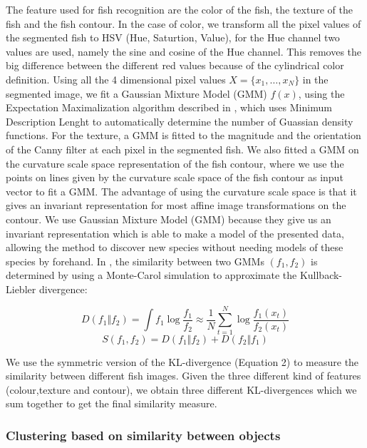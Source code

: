 The feature used for fish recognition are the color of the fish, the texture of the fish and the fish contour.
In the case of color, we transform all the pixel values of the segmented fish to HSV (Hue, Saturtion, 
Value), for the Hue channel two values are used, namely the sine and cosine of the Hue channel. This removes the big 
difference between the different red values because of the cylindrical color definition. Using all the 4 dimensional
pixel values $X = \{x_{1},\dots,x_{N}\}$ in the segmented image, we fit a Gaussian Mixture Model (GMM) $f(x)$, using 
the Expectation Maximalization 
algorithm described in \cite{zivkovic_recursive_2004}, which uses Minimum Description Lenght to automatically determine 
the number of Guassian density functions. For the texture, a GMM is fitted to the magnitude and the orientation of the 
Canny filter at each pixel in the segmented fish. We also fitted a GMM on the curvature
scale space representation of the fish contour, where we use the points on lines given by the curvature 
scale space of the fish contour as input vector to fit a GMM. The advantage of using the curvature scale space is that
it gives an invariant representation for most affine image transformations on the contour. We use 
Gaussian Mixture Model (GMM) because they give us an invariant representation which is able to make a model
of the presented data, allowing the method to discover new species without needing models of these species
by forehand. 
In \cite{goldberger_unsupervised_2006}, the similarity between two GMMs $(f_{1},f_{2})$ is determined by using a Monte-Carol
simulation to approximate the Kullback-Liebler divergence:

\begin{equation}
 D(f_{1} \Vert f_{2}) = \int f_{1} \log \frac{f_{1}}{f_{2}} \approx \frac{1}{N} \sum_{t=1}^{N} \log \frac{f_{1}(x_t)}{f_{2}(x_t)} 
\end{equation}
\begin{equation} 
 S(f_{1},f_{2}) = D(f_{1} \Vert f_{2}) + D(f_{2} \Vert f_{1})
\end{equation}

We use the symmetric version of the KL-divergence (Equation 2) to measure the similarity between different 
fish images. Given the three different kind of features (colour,texture and contour), we obtain three different 
KL-divergences which we sum together to get the final similarity measure. 

\subsubsection{\textbf{Clustering based on similarity between objects}}

